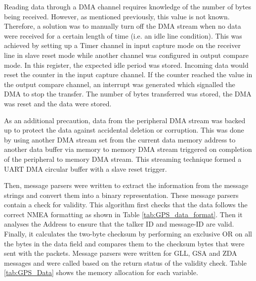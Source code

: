 Reading data through a DMA channel requires knowledge of the number of bytes being received. However, as mentioned previously, this value is not known. Therefore, a solution was to manually turn off the DMA stream when no data were received for a certain length of time (i.e. an idle line condition). This was achieved by setting up a Timer channel in input capture mode on the receiver line in slave reset mode while another channel was configured in output compare mode. In this register, the expected idle period was stored. Incoming data would reset the counter in the input capture channel. If the counter reached the value in the output compare channel, an interrupt was generated which signalled the DMA to stop the transfer. The number of bytes transferred was stored, the DMA was reset and the data were stored. \par 

As an additional precaution, data from the peripheral DMA stream was backed up to protect the data against accidental deletion or corruption. This was done by using another DMA stream set from the current data memory address to another data buffer via memory to memory DMA stream triggered on completion of the peripheral to memory DMA stream. This streaming technique formed a UART DMA circular buffer with a slave reset trigger.\par 

Then, message parsers were written to extract the information from the message strings and convert them into a binary representation. These message parsers contain a check for validity. This algorithm first checks that the data follows the correct NMEA formatting as shown in Table \ref{tab:GPS_data_format}. Then it analyses the Address to ensure that the talker ID and message-ID are valid. Finally, it calculates the two-byte checksum by performing an exclusive OR on all the bytes in the data field and compares them to the checksum bytes that were sent with the packets. Message parsers were written for GLL, GSA and ZDA messages and were called based on the return status of the validity check. Table \ref{tab:GPS_Data} shows the memory allocation for each variable. 

